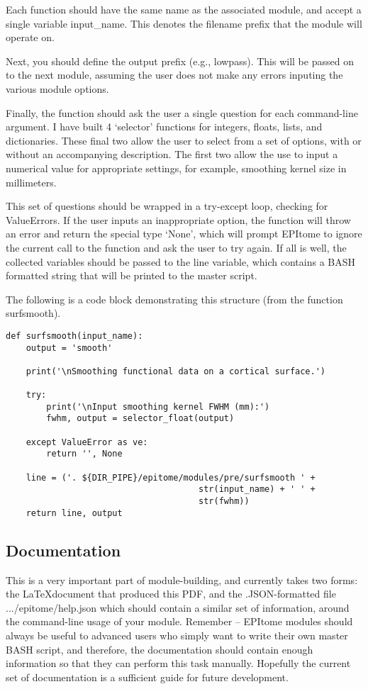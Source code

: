 \documentclass[final,titlepage,letterpaper,oneside,12pt]{article}
\renewcommand{\texttt}[2][BrickRed]{\textcolor{#1}{\ttfamily #2}}%
\begin{document}
Each function should have the same name as the associated module, and accept a single variable \texttt{input\_name}. This denotes the filename prefix that the module will operate on.

Next, you should define the output prefix (e.g., \texttt{lowpass}). This will be passed on to the next module, assuming the user does not make any errors inputing the various module options.

Finally, the function should ask the user a single question for each command-line argument. I have built 4 `selector' functions for integers, floats, lists, and dictionaries. These final two allow the user to select from a set of options, with or without an accompanying description. The first two allow the use to input a numerical value for appropriate settings, for example, smoothing kernel size in millimeters.

This set of questions should be wrapped in a try-except loop, checking for ValueErrors. If the user inputs an inappropriate option, the function will throw an error and return the special type `None', which will prompt EPItome to ignore the current call to the function and ask the user to try again. If all is well, the collected variables should be passed to the \texttt{line} variable, which contains a BASH formatted string that will be printed to the master script.

The following is a code block demonstrating this structure (from the function \texttt{surfsmooth}).

\begin{lstlisting}
def surfsmooth(input_name):    
    output = 'smooth'

    print('\nSmoothing functional data on a cortical surface.')

    try:
        print('\nInput smoothing kernel FWHM (mm):')
        fwhm, output = selector_float(output)

    except ValueError as ve:
        return '', None

    line = ('. ${DIR_PIPE}/epitome/modules/pre/surfsmooth ' +
                                      str(input_name) + ' ' +
                                      str(fwhm))
    return line, output
\end{lstlisting}

\subsection{Documentation}

This is a very important part of module-building, and currently takes two forms: the \LaTeX document that produced this PDF, and the .JSON-formatted file \texttt{.../epitome/help.json} which should contain a similar set of information, around the command-line usage of your module. Remember -- EPItome modules should always be useful to advanced users who simply want to write their own master BASH script, and therefore, the documentation should contain enough information so that they can perform this task manually. Hopefully the current set of documentation is a sufficient guide for future development.

\newpage 


\end{document}
